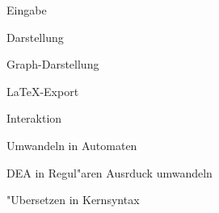 {
   \begin{itemgroup}{}
      \item Eingabe
      \item Darstellung
      \begin{itemgroup}{}
         \item Graph-Darstellung
         \item \LaTeX-Export
      \end{itemgroup}
      \item Interaktion
      \begin{itemgroup}{}
         \item Umwandeln in Automaten
         \item DEA in Regul"aren Ausrduck umwandeln
         \item "Ubersetzen in Kernsyntax
      \end{itemgroup}
   \end{itemgroup}
   \vfill{}
}
